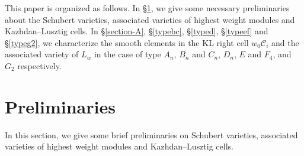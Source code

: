 \documentclass[11pt, reqno]{amsart}
\renewcommand{\subset}{\subseteq}
\theoremstyle{definition}
\numberwithin{equation}{section}
\newcommand{\fb}{\mathfrak{b}}
\newcommand{\fg}{\mathfrak{g}}
\newcommand{\fh}{\mathfrak{h}}
\newcommand{\fl}{\mathfrak{l}}
\newcommand{\fp}{\mathfrak{p}}
\newcommand{\fq}{\mathfrak{q}}
\newcommand{\fu}{\mathfrak{u}}
\begin{document}
  This paper is organized as follows. In \S \ref{pre}, we  give some necessary preliminaries about the Schubert varieties, associated varieties of highest weight modules and Kazhdan--Lusztig cells. In \S \ref{section-A}, \S \ref{typebc}, \S \ref{typed}, \S \ref{typeef} and \S \ref{typeg2}, we characterize the smooth elements  in the KL right cell $w_0\mathcal{C}_i$ and  the associated variety of $L_w$ in the case of type $A_{n}$, $B_n$ and $C_n$, $D_n$, $E$ and $F_4$, and $G_2$ respectively.

 



\section{Preliminaries}\label{pre}
In this section, we give some brief preliminaries on Schubert varieties, associated varieties of highest weight modules and Kazhdan--Lusztig cells.




\end{document}
